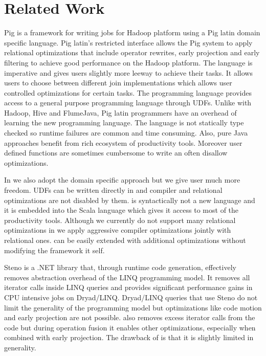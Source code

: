 \section{Related Work}
\label{sec:related-work}


Pig is a framework for writing jobs for Hadoop platform using a Pig latin domain specific language. Pig latin's restricted interface allows the Pig system to apply relational optimizations that include operator rewrites, early projection and early filtering to achieve good performance on the Hadoop platform. The language is imperative and gives users slightly more leeway to achieve their tasks. It allows users to choose between different join implementations which allows user controlled optimizations for certain tasks. The programming language provides access to a general purpose programming language through UDFs.  Unlike with Hadoop, Hive and FlumeJava, Pig latin programmers have an overhead of learning the new programming language. The language is not statically type checked so runtime failures are common and time consuming. Also, pure Java approaches benefit from rich ecosystem of productivity tools. Moreover user defined functions are sometimes cumbersome to write an often disallow optimizations.

In \tool we also adopt the domain specific approach but we give user much more freedom. UDFs can be written directly in \tool and compiler and relational optimizations are not disabled by them. \tool is syntactically not a new language and it is embedded into the Scala language which gives it access to most of the productivity tools. Although we currently do not support many relational optimizations in \tool we apply aggressive compiler optimizations jointly with relational ones. \tool can be easily extended with additional optimizations without modifying the framework it self.

Steno is a .NET library that, through runtime code generation, effectively removes abstraction overhead of the LINQ programming model. It removes all iterator calls inside LINQ queries and provides significant performance gains in CPU intensive jobs on Dryad/LINQ. Dryad/LINQ queries that use Steno do not limit the generality of the programming model but optimizations like code motion and early projection are not possible. 
\tool also removes excess iterator calls from the code but during operation fusion it enables other optimizations, especially when combined with early projection. The drawback of \tool is that it is slightly limited in generality.    

